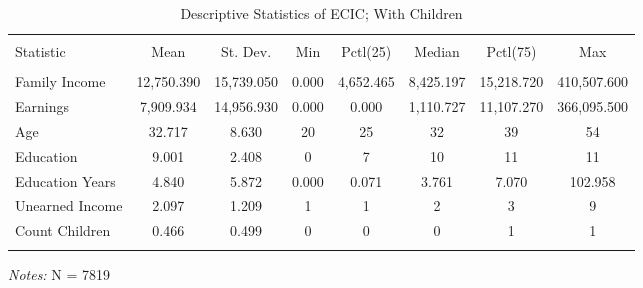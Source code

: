 \documentclass[a4paper]{article}
\begin{document}
\begin{table}[!htbp] 
\begin{adjustwidth}{-0cm}{-0cm}
\begin{threeparttable}
\small
\captionsetup{font=small, justification=raggedright,singlelinecheck=false}
  \caption{Descriptive Statistics of ECIC; With Children} 
  \label{} 
\begin{tabular}{@{\extracolsep{5pt}}lccccccc} 
\\[-1.8ex]\hline 
\hline \\[-1.8ex] 
Statistic & \multicolumn{1}{c}{Mean} & \multicolumn{1}{c}{St. Dev.} & \multicolumn{1}{c}{Min} & \multicolumn{1}{c}{Pctl(25)} & \multicolumn{1}{c}{Median} & \multicolumn{1}{c}{Pctl(75)} & \multicolumn{1}{c}{Max} \\ 
\hline \\[-1.8ex] 
Family Income & 12,750.390 & 15,739.050 & 0.000 & 4,652.465 & 8,425.197 & 15,218.720 & 410,507.600 \\ 
Earnings & 7,909.934 & 14,956.930 & 0.000 & 0.000 & 1,110.727 & 11,107.270 & 366,095.500 \\ 
Age & 32.717 & 8.630 & 20 & 25 & 32 & 39 & 54 \\ 
Education & 9.001 & 2.408 & 0 & 7 & 10 & 11 & 11 \\ 
Education Years & 4.840 & 5.872 & 0.000 & 0.071 & 3.761 & 7.070 & 102.958 \\ 
Unearned Income & 2.097 & 1.209 & 1 & 1 & 2 & 3 & 9 \\ 
Count Children & 0.466 & 0.499 & 0 & 0 & 0 & 1 & 1 \\ 
\hline \\[-1.8ex] 
\end{tabular} 
\begin{tablenotes}
      \small
      \item\textit{Notes:} N = 7819
    \end{tablenotes}
\end{threeparttable}
\end{adjustwidth}
\end{table} 
\end{document}
